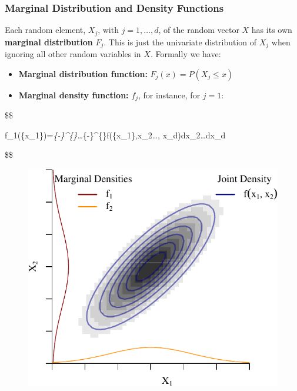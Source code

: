 \documentclass[
  letterpaper,
  DIV=11,
  numbers=noendperiod]{scrreprt}
\providecommand{\tightlist}{%
  \setlength{\itemsep}{0pt}\setlength{\parskip}{0pt}}\usepackage{longtable,booktabs,array}
\theoremstyle{definition}
\theoremstyle{plain}
\theoremstyle{plain}
\theoremstyle{remark}
\begin{document}
\hypertarget{marginal-distribution-and-density-functions}{%
\subsubsection{Marginal Distribution and Density
Functions}\label{marginal-distribution-and-density-functions}}

Each random element, \(X_j\), with \(j=1,\dots,d\), of the random vector
\(X\) has its own \textbf{marginal distribution} \(F_j\). This is just
the univariate distribution of \(X_j\) when ignoring all other random
variables in \(X\). Formally we have:

\begin{itemize}
\tightlist
\item
  \textbf{Marginal distribution function:} \(F_j(x)=P(X_j\leq x)\)
\item
  \textbf{Marginal density function:} \(f_j\), for instance, for
  \(j=1\):
\end{itemize}

\$\$

f\_1(\{\color{blue}x\_1\})=\int\emph{\{-\infty\}\^{}\{\infty\}\dots \int}\{-\infty\}\^{}\{\infty\}f(\{\color{blue}x\_1\},x\_2\dots,
x\_d)dx\_2\dots  dx\_d

\$\$

\begin{figure}

{\centering \includegraphics{./02-Review-Prob_n_Stats_files/figure-pdf/unnamed-chunk-4-1.pdf}

}

\end{figure}
\end{document}
